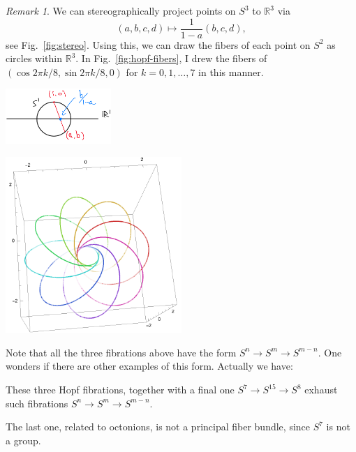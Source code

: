 \documentclass[12pt]{article}
\numberwithin{equation}{section}
\theoremstyle{remark}
\newtheorem{remark}[definition]{Remark}
\renewenvironment{figure}[1][]{
  \begin{originalfigure}[#1]
    \begin{mdframed}[linecolor=black!0,backgroundcolor=black!1]
}{
    \end{mdframed}
  \end{originalfigure}
}
\def\bR{\mathbb{R}}
\begin{document}
\begin{remark}
We can stereographically project points on $S^3$ to $\bR^3$ via \begin{equation}
(a,b,c,d) \mapsto \frac{1}{1-a}(b,c,d),
\end{equation} see Fig.~\ref{fig:stereo}.
Using this, we can draw the fibers of each point on $S^2$ as circles within $\bR^3$.
In Fig.~\ref{fig:hopf-fibers}, I drew the fibers of $(\cos 2\pi k/8, \sin 2\pi k/8, 0)$ for $k=0,1,\ldots,7$ in this manner.
\begin{figure}[h]
\centering   
\includegraphics[width=0.3\textwidth]{stereo.png}
  \caption{Stereographical projection from $S^3$ to $\bR^3$}
  \label{fig:stereo}
\end{figure}
\begin{figure}[h]
\centering   
\includegraphics[width=0.5\textwidth]{hopf-fibers.png}
  \caption{Fibers of the Hopf fibration, drawn after a stereographic projection.}
  \label{fig:hopf-fibers}
\end{figure}
\end{remark}


Note that all the three fibrations above have the form
$S^n \to S^m \to S^{m-n}$.
One wonders if there are other examples of this form.
Actually we have:
\begin{fact}
These three Hopf fibrations, together with a final one
$S^7\to S^{15}\to S^8$
 exhaust 
such fibrations $S^n\to S^m\to S^{m-n}$.
\end{fact}
The last one, related to octonions, is not a principal fiber bundle, since $S^7$ is not a group.
\end{document}
